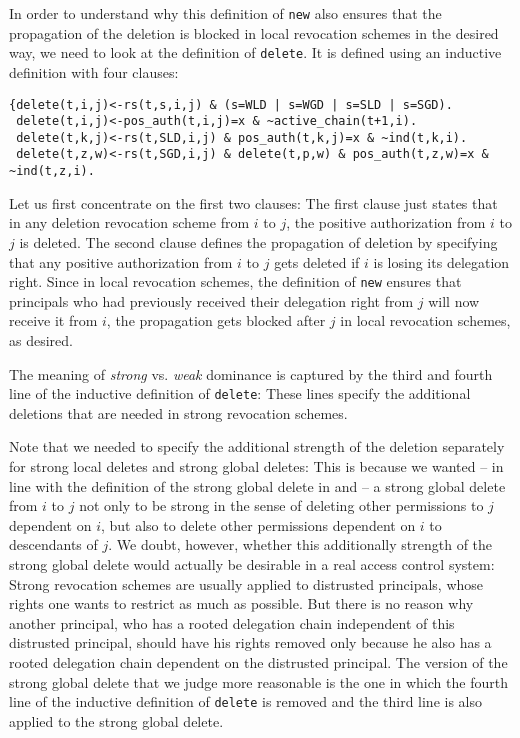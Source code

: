 \documentclass[runningheads]{llncs}
\begin{document}
In order to understand why this definition of \texttt{new} also ensures that the propagation of the deletion is blocked in local revocation schemes in the desired way, we need to look at the definition of \texttt{delete}. It is defined using an inductive definition with four clauses:
\vspace{-3mm}
\begin{lstlisting}[caption={The definition of \texttt{delete} captures the dominance dimension},label={delete}]
{delete(t,i,j)<-rs(t,s,i,j) & (s=WLD | s=WGD | s=SLD | s=SGD).
 delete(t,i,j)<-pos_auth(t,i,j)=x & ~active_chain(t+1,i).
 delete(t,k,j)<-rs(t,SLD,i,j) & pos_auth(t,k,j)=x & ~ind(t,k,i).
 delete(t,z,w)<-rs(t,SGD,i,j) & delete(t,p,w) & pos_auth(t,z,w)=x & ~ind(t,z,i).
\end{lstlisting}
Let us first concentrate on the first two clauses: The first clause just states that in any deletion revocation scheme from $i$ to $j$, the positive authorization from $i$ to $j$ is deleted. The second clause defines the propagation of deletion by specifying that any positive authorization from $i$ to $j$ gets deleted if $i$ is losing its delegation right. Since in local revocation schemes, the definition of \texttt{new} ensures that principals who had previously received their delegation right from $j$ will now receive it from $i$, the propagation gets blocked after $j$ in local revocation schemes, as desired.

The meaning of \emph{strong} vs. \emph{weak} dominance is captured by the third and fourth line of the inductive definition of \texttt{delete}: These lines specify the additional deletions that are needed in strong revocation schemes. 

Note that we needed to specify the additional strength of the deletion separately for strong local deletes and strong global deletes: This is because we wanted -- in line with the definition of the strong global delete in \cite{Hagstrom} and \cite{Aucher} -- a strong global delete from $i$ to $j$ not only to be strong in the sense of deleting other permissions to $j$ dependent on $i$, but also to delete other permissions dependent on $i$ to descendants of $j$. We doubt, however, whether this additionally strength of the strong global delete would actually be desirable in a real access control system: Strong revocation schemes are usually applied to distrusted principals, whose rights one wants to restrict as much as possible. But there is no reason why another principal, who has a rooted delegation chain independent of this distrusted principal, should have his rights removed only because he also has a rooted delegation chain dependent on the distrusted principal. The version of the strong global delete that 
we judge more reasonable is the one in which the fourth line of the inductive definition of \texttt{delete} is removed and the third line is also applied to the strong global delete.
\end{document}
